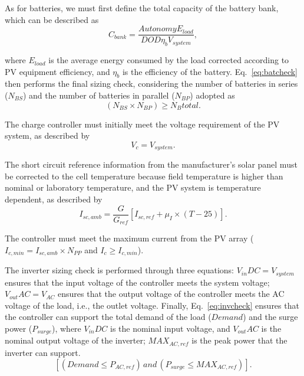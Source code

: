 \documentclass[journal]{IEEEtran}
\begin{document}
As for batteries, we must first define the total capacity of the battery bank, which can be described as
%
\begin{equation}
\label{eq:Cbank}
C_{bank} = \dfrac{Autonomy E_{load}}{DOD \eta _{b} V_{system}},
\end{equation}

\noindent where $ E_{load} $ is the average energy consumed by the load corrected according to PV equipment efficiency, and $ \eta_{b} $ is the efficiency of the battery.
%
Eq.~\ref{eq:batcheck} then performs the final sizing check, considering the number of batteries in series ($ N_{BS} $) and the number of batteries in parallel ($ N_{BP} $) adopted as
%
\begin{equation}
\label{eq:batcheck}
\left( N_{BS} \times N_{BP} \right) \geq N_{B}total.
\end{equation}

The charge controller must initially meet the voltage requirement of the PV system, as described by
% 
\begin{equation}
\label{eq:vcvsystem}
V_{c} = V_{system}.
\end{equation}

The short circuit reference information from the manufacturer's solar panel must be corrected to the cell temperature because field temperature is higher than nominal or laboratory temperature, and the PV system is temperature dependent, as described by
%
\begin{equation}
\label{eq:iscamb}
I_{sc,amb} = \dfrac{G}{G_{ref}} \left[ I_{sc,ref} + \mu_{I} \times (T-25) \right]. 
\end{equation}

The controller must meet the maximum current from the PV array ($I_{c,min} = I_{sc,amb} \times N_{PP}$ and $I_{c} \geq I_{c,min}$).

The inverter sizing check is performed through three equations: $V_{in}DC = V_{system}$ ensures that the input voltage of the controller meets the system voltage; $V_{out}AC = V_{AC}$ ensures that the output voltage of the controller meets the AC voltage of the load, i.e., the outlet voltage. Finally, Eq.~\eqref{eq:invcheck} ensures that the controller can support the total demand of the load ($Demand$) and the surge power ($P_{surge}$), where $V_{in}DC$ is the nominal input voltage, and $V_{out}AC$ is the nominal output voltage of the inverter; $MAX_{AC,ref}$ is the peak power that the inverter can support.
%
\begin{equation}
\label{eq:invcheck} 
\left[ (Demand \leq P_{AC,ref}) \, and \, (P_{surge} \leq MAX_{AC,ref}) \right].
\end{equation}
\end{document}
